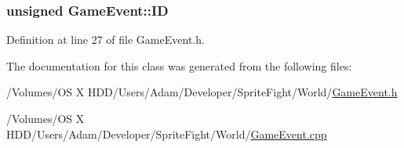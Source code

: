 \hypertarget{class_game_event_aecdf600e852c5a4f02f3cf2af0f6fe0f}{
\subsubsection[{I\-D}]{\setlength{\rightskip}{0pt plus 5cm}unsigned Game\-Event\-::\-I\-D\hspace{0.3cm}{\ttfamily [protected]}}}\label{class_game_event_aecdf600e852c5a4f02f3cf2af0f6fe0f}


Definition at line 27 of file Game\-Event.\-h.



The documentation for this class was generated from the following files\-:\begin{DoxyCompactItemize}
\item 
/\-Volumes/\-O\-S X H\-D\-D/\-Users/\-Adam/\-Developer/\-Sprite\-Fight/\-World/\hyperlink{_game_event_8h}{Game\-Event.\-h}\item 
/\-Volumes/\-O\-S X H\-D\-D/\-Users/\-Adam/\-Developer/\-Sprite\-Fight/\-World/\hyperlink{_game_event_8cpp}{Game\-Event.\-cpp}\end{DoxyCompactItemize}
